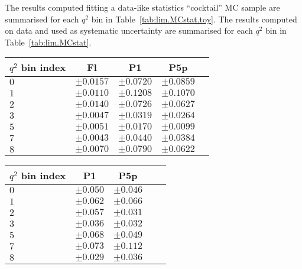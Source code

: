 The results computed fitting a data-like statistics ``cocktail'' MC sample are summarised for each $q^2$ bin in Table~\ref{tab:lim.MCstat.toy}.
The results computed on data and used as systematic uncertainty are summarised for each $q^2$ bin in Table~\ref{tab:lim.MCstat}.

\begin{table*}[!htb]
  \begin {center}
    \begin{small}
      \caption{Spread values of the toy-efficiency result distributions, computed fitting a data-like statistics ``cocktail'' MC sample.
        \label{tab:lim.MCstat.toy}}
      \begin{tabular}{|l|c|c|c|c|}
        \hline
        $q^2$ bin index  & Fl  & P1 & P5p \\
        \hline
        $ 0 $ & $\pm0.0157$ & $\pm0.0720$ & $\pm0.0859$\\
        $ 1 $ & $\pm0.0110$ & $\pm0.1208$ & $\pm0.1070$\\
        $ 2 $ & $\pm0.0140$ & $\pm0.0726$ & $\pm0.0627$\\
        $ 3 $ & $\pm0.0047$ & $\pm0.0319$ & $\pm0.0264$\\
        $ 5 $ & $\pm0.0051$ & $\pm0.0170$ & $\pm0.0099$\\
        $ 7 $ & $\pm0.0043$ & $\pm0.0440$ & $\pm0.0384$\\
        $ 8 $ & $\pm0.0070$ & $\pm0.0790$ & $\pm0.0622$\\
	\hline
      \end{tabular}
    \end{small}
  \end{center}
\end{table*}

\begin{table*}[!htb]
  \begin {center}
    \begin{small}
      \caption{Spread values of the toy-efficiency result distributions, computed fitting real data.
        \label{tab:lim.MCstat}}
      \begin{tabular}{|l|c|c|c|c|}
        \hline
        $q^2$ bin index  & P1 & P5p \\
        \hline
        $ 0 $ & $\pm0.050$ & $\pm0.046$\\
        $ 1 $ & $\pm0.062$ & $\pm0.066$\\
        $ 2 $ & $\pm0.057$ & $\pm0.031$\\
        $ 3 $ & $\pm0.036$ & $\pm0.032$\\
        $ 5 $ & $\pm0.068$ & $\pm0.049$\\
        $ 7 $ & $\pm0.073$ & $\pm0.112$\\
        $ 8 $ & $\pm0.029$ & $\pm0.036$\\
	\hline
      \end{tabular}
    \end{small}
  \end{center}
\end{table*}

